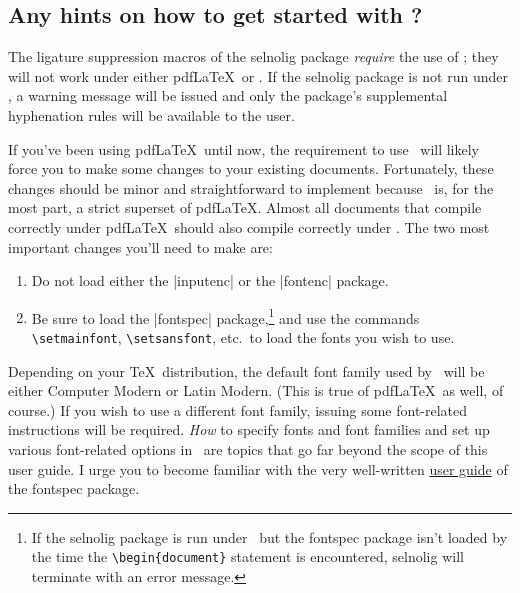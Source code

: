 \documentclass[11pt]{article}
\newcommand{\pkg}[1]{\textsf{#1}}
\newcommand{\cmmd}[1]{\texttt{\textbackslash #1}}
\begin{document}
\subsection{Any hints on how to get started with \LuaLaTeX?}

\begingroup
\renewcommand\theenumi{(\roman{enumi})}
\renewcommand\labelenumi\theenumi


The ligature suppression macros of the \pkg{selnolig} package \emph{require} the use of \LuaLaTeX; they will not work under either pdf\LaTeX\ or \XeLaTeX. If the \pkg{selnolig} package is not run under \LuaLaTeX, a warning message will be issued and only the package's supplemental hyphenation rules will be available to the user.

If you've been using pdf\LaTeX\ until now, the requirement to use \LuaLaTeX\ will likely force you to make some changes to your existing documents. Fortunately, these changes should be minor and straightforward to implement because \LuaLaTeX\ is, for the most part, a strict superset of pdf\LaTeX. Almost all documents that compile correctly under pdf\LaTeX\ should also compile correctly under \LuaLaTeX. 
The two most important changes you'll need to make are: 
\begin{enumerate}
\item Do not load either the |inputenc| or the |fontenc| package. 
\item Be sure to load the |fontspec| package,\footnote{If the \pkg{selnolig} package is run under \LuaLaTeX\ but the \pkg{fontspec} package isn't loaded by the time the \Verb+\begin{document}+ statement is encountered, \pkg{selnolig} will terminate with an error message.} and use the commands \cmmd{setmainfont}, \cmmd{setsansfont}, etc.\ to load the fonts you wish to use.
\end{enumerate}
\endgroup


Depending on your \TeX\ distribution, the default font family used by \LuaLaTeX\ will be either Computer Modern or Latin Modern. (This is true of pdf\LaTeX\ as well, of course.) If you wish to use a different font family, issuing some font-related instructions will be required. \emph{How} to specify fonts and font families and set up various font-related options in \LuaLaTeX\ are topics that go far beyond the scope of this user guide. I urge you to become familiar with the very well-written
 \href{http://www.ctan.org/tex-archive/macros/latex/contrib/fontspec/fontspec.pdf}{user guide} of the \pkg{fontspec} package.
\end{document}
